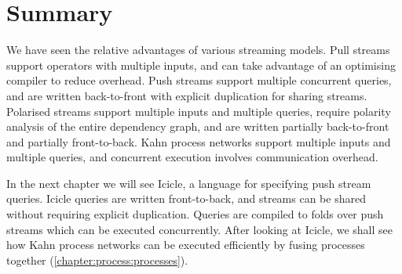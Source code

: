 


\section{Summary}
We have seen the relative advantages of various streaming models.
Pull streams support operators with multiple inputs, and can take advantage of an optimising compiler to reduce overhead.
Push streams support multiple concurrent queries, and are written back-to-front with explicit duplication for sharing streams.
Polarised streams support multiple inputs and multiple queries, require polarity analysis of the entire dependency graph, and are written partially back-to-front and partially front-to-back.
Kahn process networks support multiple inputs and multiple queries, and concurrent execution involves communication overhead.

In the next chapter we will see Icicle, a language for specifying push stream queries.
Icicle queries are written front-to-back, and streams can be shared without requiring explicit duplication.
Queries are compiled to folds over push streams which can be executed concurrently.
After looking at Icicle, we shall see how Kahn process networks can be executed efficiently by fusing processes together (\cref{chapter:process:processes}).

